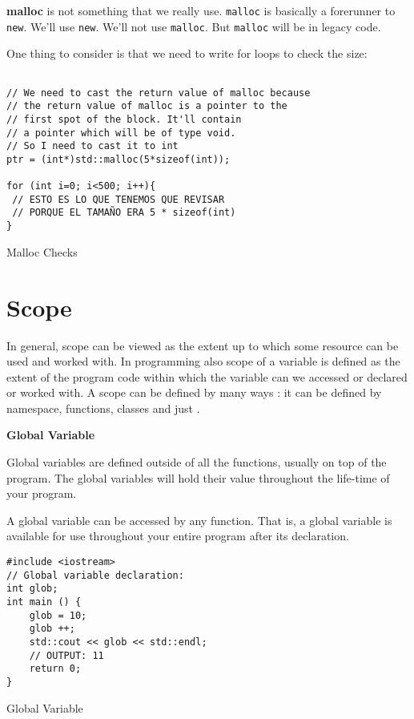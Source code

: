 \documentclass[11pt, a4paper]{article}
\begin{document}
\textbf{malloc} is not something that we really use. \texttt{malloc} is basically a forerunner to \texttt{new}. We'll use \texttt{new}. We'll not use \texttt{malloc}. But \texttt{malloc} will be in legacy code. 


One thing to consider is that we need to write for loops to check the size:


\begin{listing}
\begin{verbatim}

// We need to cast the return value of malloc because
// the return value of malloc is a pointer to the
// first spot of the block. It'll contain
// a pointer which will be of type void.
// So I need to cast it to int
ptr = (int*)std::malloc(5*sizeof(int));

for (int i=0; i<500; i++){
 // ESTO ES LO QUE TENEMOS QUE REVISAR
 // PORQUE EL TAMAÑO ERA 5 * sizeof(int)
}
\end{verbatim}
\caption{Malloc Checks}
\label{lst:malloc_checks}
\end{listing}




\section{Scope}%
\label{sec:scope}

In general, scope can be viewed as the extent up to which some resource can be used and worked with. In programming also scope of a variable is defined as the extent of the program code within which the variable can we accessed or declared or worked with. A scope can be defined by many ways : it can be defined by namespace, functions, classes and just { }.



\textbf{Global Variable}

Global variables are defined outside of all the functions, usually on top of the program. The global variables will hold their value throughout the life-time of your program.

A global variable can be accessed by any function. That is, a global variable is available for use throughout your entire program after its declaration.


\begin{listing}
\begin{verbatim}
#include <iostream>
// Global variable declaration:
int glob;
int main () {
    glob = 10;
    glob ++;
    std::cout << glob << std::endl;
    // OUTPUT: 11
    return 0;
}
\end{verbatim}
\caption{Global Variable}
\label{lst:global_variable}
\end{listing}
\end{document}
